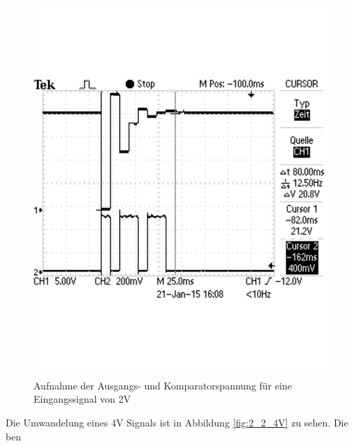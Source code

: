 \documentclass[12pt,a4paper]{article}
\begin{document}
\begin{figure}[H]
  \centering 	
    \includegraphics[trim = 0mm 50mm 0mm 50mm, clip, scale = 0.4]{2_2_2V.pdf}
  	\caption[Aufnahme der Ausgangs- und Komparatorspannung für eine Eingangssignal von 2V]{Aufnahme der Ausgangs- und Komparatorspannung für eine Eingangssignal von 2V} 
  \label{fig:2_2_2V}
\end{figure}

Die Umwandelung eines 4V Signals ist in Abbildung \ref{fig:2_2_4V} zu sehen. Die ben
\end{document}
